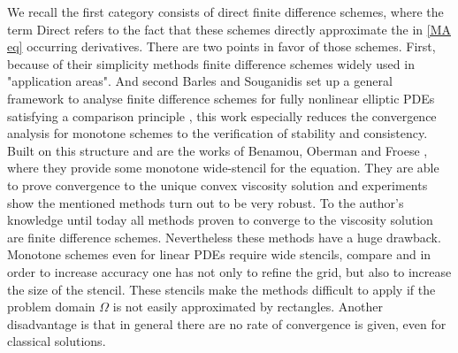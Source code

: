 We recall the first category consists of direct finite difference schemes, where the term Direct refers to the fact that these schemes directly approximate the in \eqref{MA eq} occurring derivatives. 
There are two points in favor of those schemes. First, because of their simplicity methods finite difference schemes widely used in "application areas".  And second Barles and Souganidis set up a general framework to analyse finite difference schemes for fully nonlinear elliptic PDEs satisfying a comparison principle \cite{BS1991}, this work especially reduces the convergence analysis for monotone schemes to the verification of stability and consistency.
Built on this structure and are the works of Benamou, Oberman and Froese \cite{BFO2010, Oberman2008, FO2011}, where they provide some monotone wide-stencil for the \MA equation.
They are able to prove convergence to the unique convex viscosity solution and experiments show the mentioned methods turn out to be very robust. To the author's knowledge until today all methods proven to converge to the viscosity solution are finite difference schemes.
Nevertheless these methods have a huge drawback. Monotone schemes even for linear PDEs require wide stencils, compare \cite{MW1953}  and in order to increase accuracy one has not only to refine the grid, but also to increase the size of the stencil. These stencils make the methods difficult to apply if the problem domain $\Omega$ is not easily approximated by rectangles. Another disadvantage is that in general there are no rate of convergence is given, even for classical solutions.

